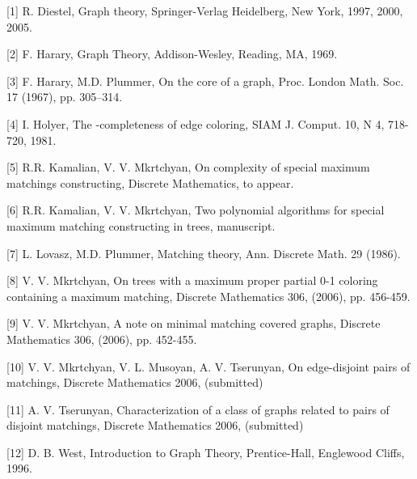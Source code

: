 \documentclass{article}
\begin{document}
[1] R. Diestel, Graph theory, Springer-Verlag Heidelberg, New York, 1997,
2000, 2005.

[2] F. Harary, Graph Theory, Addison-Wesley, Reading, MA, 1969.

[3] F. Harary, M.D. Plummer, On the core of a graph, Proc. London Math. Soc.
17 (1967), pp. 305--314.

[4] I. Holyer, The -completeness of edge coloring, SIAM J. Comput. 10, N
4, 718-720, 1981.

[5] R.R. Kamalian, V. V. Mkrtchyan, On complexity of special maximum
matchings constructing, Discrete Mathematics, to appear.

[6] R.R. Kamalian, V. V. Mkrtchyan, Two polynomial algorithms for special
maximum matching constructing in trees, manuscript.

[7] L. Lovasz, M.D. Plummer, Matching theory, Ann. Discrete Math. 29 (1986).

[8] V. V. Mkrtchyan, On trees with a maximum proper partial 0-1 coloring
containing a maximum matching, Discrete Mathematics 306, (2006), pp. 456-459.

[9] V. V. Mkrtchyan, A note on minimal matching covered graphs, Discrete
Mathematics 306, (2006), pp. 452-455.

[10] V. V. Mkrtchyan, V. L. Musoyan, A. V. Tserunyan, On edge-disjoint pairs
of matchings, Discrete Mathematics 2006, (submitted)

[11] A. V. Tserunyan, Characterization of a class of graphs related to pairs
of disjoint matchings, Discrete Mathematics 2006, (submitted)

[12] D. B. West, Introduction to Graph Theory, Prentice-Hall, Englewood
Cliffs, 1996.
\end{document}
